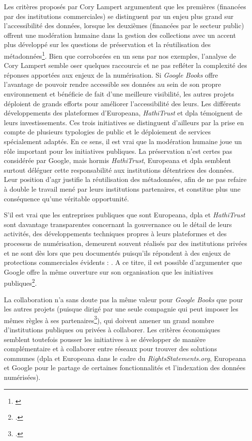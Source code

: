 Les critères proposés par Cory Lampert argumentent que les premières (financées par des institutions commerciales) se distinguent par un enjeu plus grand sur l'accessibilité des données, lorsque les deuxièmes (financées par le secteur public) offrent une modération humaine dans la gestion des collections avec un accent plus développé sur les questions de préservation et la réutilisation des métadonnées\footnote{\cite[p.47]{lampert_ramping_2018}}. Bien que corroborées en un sens par nos exemples, l'analyse de Cory Lampert semble oser quelques raccourcis et ne pas refléter la complexité des réponses apportées aux enjeux de la numérisation. Si \textit{Google Books} offre l'avantage de pouvoir rendre accessible ses données au sein de son propre environnement et bénéficie de fait d'une meilleure visibilité, les autres projets déploient de grands efforts pour améliorer l'accessibilité des leurs. Les différents développements des plateformes d'Europeana, \textit{HathiTrust} et \gls{dpla} témoignent de leurs investissements. Ces trois initiatives se distinguent d'ailleurs par la prise en compte de plusieurs typologies de public et le déploiement de services spécialement adaptés. En ce sens, il est vrai que la modération humaine joue un rôle important pour les initiatives publiques. La préservation n'est certes pas considérée par Google, mais hormis \textit{HathiTrust}, Europeana et \gls{dpla} semblent surtout déléguer cette responsabilité aux institutions détentrices des données. Leur position d'\gls{agr} justifie la réutilisation des métadonnées, afin de ne pas refaire à double le travail mené par leurs institutions partenaires, et constitue plus une conséquence qu'une véritable opportunité.

S'il est vrai que les entreprises publiques que sont Europeana, \gls{dpla} et \textit{HathiTrust} sont davantage transparentes concernant  la gouvernance ou le détail de leurs activités, des développements techniques propres à leurs plateformes et des processus de numérisation, demeurent souvent réalisés par des institutions privées et ne sont dès lors que peu documentés puisqu'ils répondent à des enjeux de protections commerciales évidents : . A ce titre, il est possible d'argumenter que Google offre la même ouverture sur son organisation que les initiatives publiques\footcite{leetaru_mass_2008}. 

La collaboration n'a sans doute pas la même valeur pour \textit{Google Books} que pour les autres projets (puisque dirigé par une seule compagnie qui peut imposer les mêmes règles à ses partenaires\footcite{leetaru_mass_2008}), qui doivent amener un grand nombre d'institutions publiques ou privées à collaborer. Les critères économiques semblent toutefois pousser les initiatives à se développer de manière complémentaire et à collaborer entre réseaux pour trouver des solutions communes (\gls{dpla} et Europeana dans le cadre du \textit{RightsStatements.org}, Europeana et Google pour le partage de certaines fonctionnalités et l'indexation des données numérisées).

